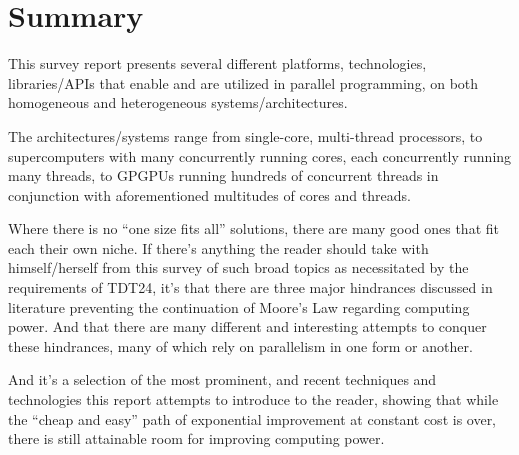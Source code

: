 
\section{Summary}
\label{sec:summary}

This survey report presents several different platforms, technologies, libraries/APIs that enable and are utilized in parallel programming, on both homogeneous and heterogeneous systems/architectures.

The architectures/systems range from single-core, multi-thread processors, to supercomputers with many concurrently running cores, each concurrently running many threads, to GPGPUs running hundreds of concurrent threads in conjunction with aforementioned multitudes of cores and threads.

Where there is no ``one size fits all'' solutions, there are many good ones that fit each their own niche.
If there's anything the reader should take with himself/herself from this survey of such broad topics as necessitated by the requirements of TDT24, it's that there are three major hindrances discussed in literature preventing the continuation of Moore's Law regarding computing power.
And that there are many different and interesting attempts to conquer these hindrances, many of which rely on parallelism in one form or another.

And it's a selection of the most prominent, and recent techniques and technologies this report attempts to introduce to the reader, showing that while the ``cheap and easy'' path of exponential improvement at constant cost is over, there is still attainable room for improving computing power.
